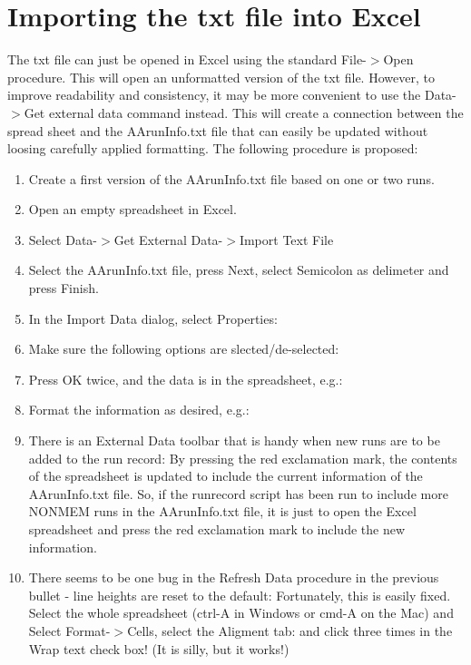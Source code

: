 \section{Importing the txt file into Excel}
The txt file can just be opened in Excel using the standard File-$>$Open procedure. This will open an unformatted version of the txt file. However, to improve readability and consistency, it may be more convenient to use the Data-$>$Get external data command instead. This will create a connection between the spread sheet and the AArunInfo.txt file that can easily be updated without loosing carefully applied formatting. The following procedure is proposed:
\begin{enumerate}
	\item Create a first version of the AArunInfo.txt file based on one or two runs.
	\item Open an empty spreadsheet in Excel.
	\item Select Data-$>$Get External Data-$>$Import Text File
	\item Select the AArunInfo.txt file, press Next, select Semicolon as delimeter and press Finish.
	\item In the Import Data dialog, select Properties:
	\item Make sure the following options are slected/de-selected:
	\item Press OK twice, and the data is in the spreadsheet, e.g.:
	\item Format the information as desired, e.g.:
	\item There is an External Data toolbar that is handy when new runs are to be added to the run record:
By pressing the red exclamation mark, the contents of the spreadsheet is updated to include the current information of the AArunInfo.txt file. So, if the runrecord script has been run to include more NONMEM runs in the AArunInfo.txt file, it is just to open the Excel spreadsheet and press the red exclamation mark to include the new information.
	\item There seems to be one bug in the Refresh Data procedure in the previous bullet - line heights are reset to the default:
Fortunately, this is easily fixed. Select the whole spreadsheet (ctrl-A in Windows or cmd-A on the Mac) and Select Format-$>$Cells, select the Aligment tab:
and click three times in the Wrap text check box! (It is silly, but it works!)
\end{enumerate}


